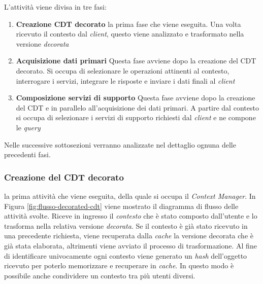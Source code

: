 L'attività viene divisa in tre fasi:

\begin{enumerate}
	\item \textbf{Creazione CDT decorato}
	\upe la prima fase che viene eseguita. Una volta ricevuto il contesto dal \emph{client}, questo viene analizzato e trasformato nella versione \emph{decorata}
	\item \textbf{Acquisizione dati primari}
	Questa fase avviene dopo la creazione del CDT decorato. Si occupa di selezionare le operazioni attinenti al contesto, interrogare i servizi, integrare le risposte e inviare i dati finali al \emph{client}
	\item \textbf{Composizione servizi di supporto}
	Questa fase avviene dopo la creazione del CDT e in parallelo all'acquisizione dei dati primari. A partire dal contesto si occupa di selezionare i servizi di supporto richiesti dal \emph{client} e ne compone le \emph{query}
\end{enumerate}

Nelle successive sottosezioni verranno analizzate nel dettaglio ognuna delle precedenti fasi.

\subsubsection*{Creazione del CDT decorato}

\upe la prima attività che viene eseguita, della quale si occupa il \emph{Context Manager}. In Figura \ref{fig:flusso-decorated-cdt} viene mostrato il diagramma di flusso delle attività svolte. Riceve in ingresso il \emph{contesto} che è stato composto dall'utente e lo trasforma nella relativa versione \emph{decorata}. Se il contesto è già stato ricevuto in una precedente richiesta, viene recuperata dalla \emph{cache} la versione decorata che è già stata elaborata, altrimenti viene avviato il processo di trasformazione. Al fine di identificare univocamente ogni contesto viene generato un \emph{hash} dell'oggetto ricevuto per poterlo memorizzare e recuperare in \emph{cache}. In questo modo è possibile anche condividere un contesto tra più utenti diversi.

